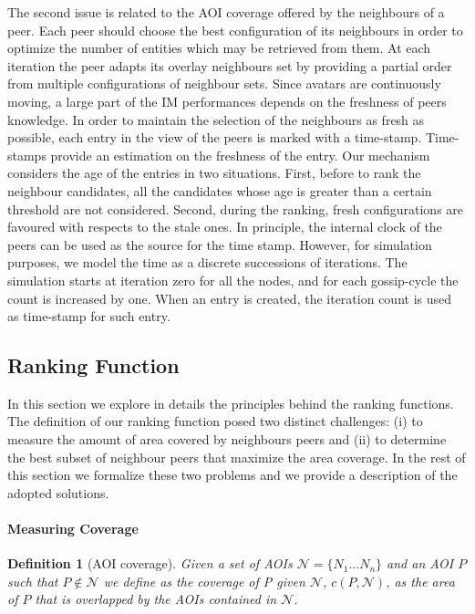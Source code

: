 \documentclass[final,10pt,a5paper]{phdimt}
\theoremstyle{definition}
\newtheorem{mydef}{Definition}
\begin{document}
The second issue is related to the AOI coverage offered by the neighbours of a peer. 
Each peer should choose the best configuration of its neighbours in order to optimize the number of entities which may be retrieved from them.
At each iteration the peer adapts its overlay neighbours set by providing a partial order from multiple configurations of neighbour sets. 
Since avatars are continuously moving, a large part of the
IM performances depends on the freshness of peers knowledge. In order to maintain the selection of the neighbours as
fresh as possible, each entry in the view of the peers is marked
with a time-stamp. Time-stamps provide an estimation on the
freshness of the entry. Our mechanism considers the age of the
entries in two situations. First, before to
rank the neighbour candidates, all the candidates whose age is
greater than a certain threshold are not considered. Second,
during the ranking, fresh configurations are favoured with
respects to the stale ones. In principle, the internal clock of the
peers can be used as the source for the time stamp. However,
for simulation purposes, we model the time as a discrete
successions of iterations. The simulation starts at iteration zero
for all the nodes, and for each gossip-cycle the count is
increased by one. When an entry is created, the iteration count
is used as time-stamp for such entry.


\subsection{Ranking Function}

In this section we explore in details the principles behind the ranking functions.
The definition of our ranking function posed two distinct challenges: (i) to measure the amount of area covered by neighbours peers and (ii) to determine the best subset of neighbour peers that maximize the area coverage. In the rest of this section we formalize these two problems and we provide a description of the adopted solutions.

\paragraph{Measuring Coverage}

\begin{mydef}[AOI coverage]
\emph{
Given a set of AOIs $\mathscr{N}=\{N_1 ... N_n\}$ and an AOI $P$ such that $P \notin \mathscr{N}$ we define as the coverage of P given $\mathscr{N}$, $c(P,\mathscr{N})$, as the area of $P$ that is overlapped by the AOIs contained in $\mathscr{N}$.}
\end{mydef}
\end{document}
